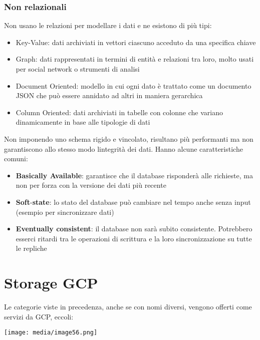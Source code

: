 \subsubsection{Non relazionali}\label{non-relazionali}

Non usano le relazioni per modellare i dati e ne esistono di più tipi:

\begin{itemize}
\item
  Key-Value: dati archiviati in vettori ciascuno acceduto da una
  specifica chiave
\item
  Graph: dati rappresentati in termini di entità e relazioni tra loro,
  molto usati per social network o strumenti di analisi
\item
  Document Oriented: modello in cui ogni dato è trattato come un
  documento JSON che può essere annidato ad altri in maniera gerarchica
\item
  Column Oriented: dati archiviati in tabelle con colonne che variano
  dinamicamente in base alle tipologie di dati
\end{itemize}

Non imponendo uno schema rigido e vincolato, risultano più performanti
ma non garantiscono allo stesso modo l\textquotesingle integrità dei
dati. Hanno alcune caratteristiche comuni:

\begin{itemize}
\item
  \textbf{Basically Available}: garantisce che il database risponderà
  alle richieste, ma non per forza con la versione dei dati più recente
\item
  \textbf{Soft}-\textbf{state}: lo stato del database può cambiare nel
  tempo anche senza input (esempio per sincronizzare dati)
\item
  \textbf{Eventually consistent}: il database non sarà subito
  consistente. Potrebbero esserci ritardi tra le operazioni di scrittura
  e la loro sincronizzazione su tutte le repliche
\end{itemize}

\section{Storage GCP}\label{storage-gcp}

Le categorie viste in precedenza, anche se con nomi diversi, vengono
offerti come servizi da GCP, eccoli:

\texttt{[image: media/image56.png]}


